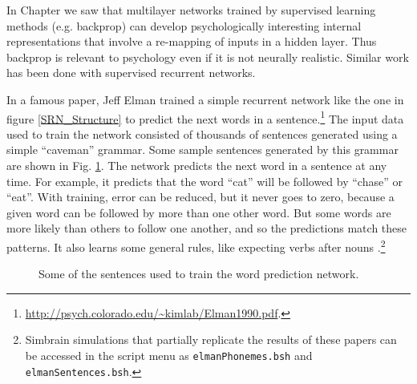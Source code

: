 
In Chapter  we saw that multilayer networks trained by supervised learning methods (e.g. backprop) can develop psychologically interesting internal representations that involve a re-mapping of inputs in a hidden layer. Thus backprop is relevant to psychology even if it is not neurally realistic. Similar work has been done with supervised recurrent networks. 

In a famous paper, Jeff Elman trained a simple recurrent network like the one in figure \ref{SRN_Structure} to predict the next words in a sentence.\footnote{\url{http://psych.colorado.edu/~kimlab/Elman1990.pdf}.}  The input data used to train the network consisted of thousands of sentences generated using a simple ``caveman'' grammar. Some sample sentences generated by this grammar are shown in Fig. \ref{elman_sentences}. The network predicts the next word in  a sentence at any time. For example, it predicts that the word ``cat'' will be followed by ``chase'' or ``eat''. With training, error can be reduced, but it never goes to zero, because a given word can be followed by more than one other word. But some words are more likely than others to follow one another, and so the predictions match these patterns. It also learns some general rules, like expecting verbs after nouns \cite{elman1990finding}.\footnote{Simbrain simulations that partially replicate the results of these papers can be accessed in the script menu as \texttt{elmanPhonemes.bsh} and \texttt{elmanSentences.bsh}.}

\begin{figure}[h]
\centering
{}
\caption[Generated by Jeff Yoshimi based on \cite{elman1990finding}.]{Some of the sentences used to train the word prediction network.}
\label{elman_sentences}
\end{figure}

